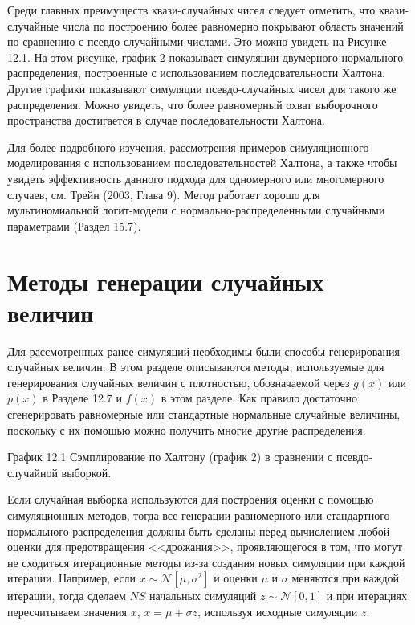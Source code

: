 Среди главных преимуществ квази-случайных чисел следует отметить, что квази-случайные числа по построению более равномерно покрывают область значений по сравнению с псевдо-случайными числами. Это можно увидеть на Рисунке 12.1. На этом рисунке, график 2  показывает симуляции двумерного нормального распределения, построенные с использованием последовательности Халтона. Другие графики показывают симуляции псевдо-случайных чисел для такого же распределения. Можно увидеть, что более равномерный охват выборочного пространства достигается в  случае последовательности Халтона.

Для более подробного изучения, рассмотрения примеров симуляционного моделирования с использованием последовательностей Халтона, а также чтобы увидеть  эффективность данного  подхода для одномерного или многомерного случаев, см. Трейн (2003, Глава 9). Метод работает хорошо для мультиномиальной логит-модели с нормально-распределенными случайными параметрами (Раздел 15.7).

\section{Методы генерации случайных величин}

Для рассмотренных ранее симуляций необходимы были способы генерирования случайных величин. В этом разделе описываются методы, используемые для генерирования случайных величин с плотностью, обозначаемой через $g(x)$ или $p(x)$ в Разделе 12.7 и $f(x)$ в этом разделе. Как правило достаточно сгенерировать равномерные или стандартные нормальные случайные величины, поскольку с их помощью можно получить многие другие распределения.

\vspace{2cm}

График 12.1 Сэмплирование по Халтону (график 2) в сравнении с псевдо-случайной выборкой.


Если случайная выборка используются для построения оценки с помощью симуляционных методов, тогда все генерации равномерного или стандартного нормального распределения должны быть сделаны перед вычислением любой оценки для предотвращения <<дрожания>>, проявляющегося в том, что могут не сходиться итерационные методы из-за создания новых симуляции при каждой итерации. Например, если $x\sim \mathcal{N}[\mu,\sigma^2]$ и оценки $\mu$ и $\sigma$ меняются при каждой итерации, тогда сделаем $NS$ начальных симуляций $z\sim \mathcal{N}[0,1]$ и при итерациях пересчитываем значения $x$, $x=\mu+\sigma{z}$, используя исходные симуляции $z$.

